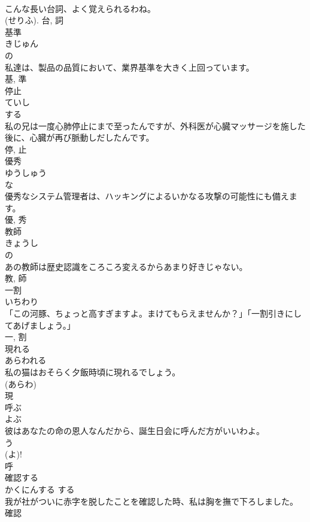 \documentclass[8pt]{extreport}
\begin{document}
\begin{CJK}{UTF8}{min}
\\	こんな長い台詞、よく覚えられるわね。	
\\	(せりふ).	台, 詞	
\\	基準	
\\	きじゅん	
\\	の 
\\	私達は、製品の品質において、業界基準を大きく上回っています。	
\\	基, 準	
\\	停止	
\\	ていし	
\\	する 
\\	私の兄は一度心肺停止にまで至ったんですが、外科医が心臓マッサージを施した後に、心臓が再び脈動しだしたんです。	
\\	停, 止	
\\	優秀	
\\	ゆうしゅう	
\\	な 
\\	優秀なシステム管理者は、ハッキングによるいかなる攻撃の可能性にも備えます。	
\\	優, 秀	
\\	教師	
\\	きょうし	
\\	の 
\\	あの教師は歴史認識をころころ変えるからあまり好きじゃない。	
\\	教, 師	
\\	一割	
\\	いちわり	
\\	「この河豚、ちょっと高すぎますよ。まけてもらえませんか？」「一割引きにしてあげましょう。」	
\\	一, 割	
\\	現れる	
\\	あらわれる	
\\	私の猫はおそらく夕飯時頃に現れるでしょう。	
\\	(あらわ) 
\\	現	
\\	呼ぶ	
\\	よぶ	
\\	彼はあなたの命の恩人なんだから、誕生日会に呼んだ方がいいわよ。	
\\	う 
\\	(よ)! 
\\	呼	
\\	確認する	
\\	かくにんする	する 
\\	我が社がついに赤字を脱したことを確認した時、私は胸を撫で下ろしました。	
\\	確認 

\end{CJK}
\end{document}
